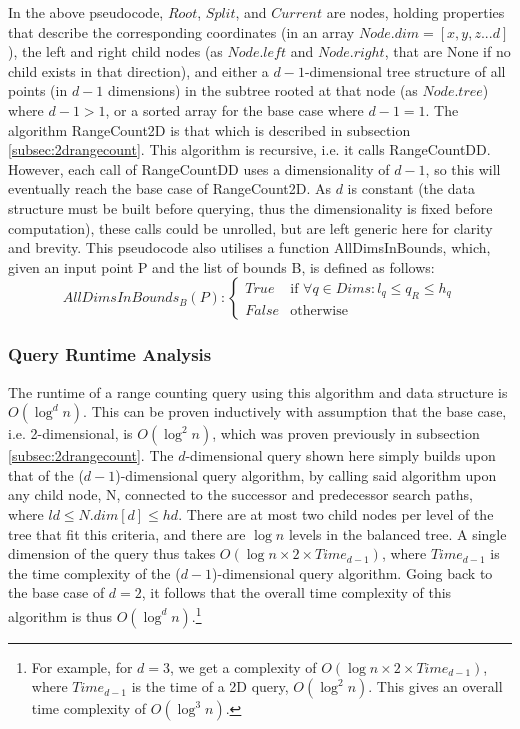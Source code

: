 \documentclass[paper=a4, fontsize=12pt]{article}
\begin{document}
In the above pseudocode, \(Root\), \(Split\), and \(Current\) are nodes, holding
properties that describe the corresponding coordinates (in an array \(Node.dim =
[x, y, z ... d]\)), the left and right child nodes (as \(Node.left\) and
\(Node.right\), that are None if no child exists in that direction), and either
a \(d-1\)-dimensional tree structure of all points (in \(d-1\) dimensions) in
the subtree rooted at that node (as \(Node.tree\)) where \(d-1 > 1\), or a
sorted array for the base case where \(d-1 = 1\). The algorithm RangeCount2D is
that which is described in subsection \ref{subsec:2drangecount}. This algorithm
is recursive, i.e. it calls RangeCountDD. However, each call of RangeCountDD
uses a dimensionality of \(d-1\), so this will eventually reach the base case of
RangeCount2D. As \(d\) is constant (the data structure must be built before
querying, thus the dimensionality is fixed before computation), these calls
could be unrolled, but are left generic here for clarity and brevity. This pseudocode also utilises a function AllDimsInBounds, which, given an input point P and the list of bounds B, is defined as follows:
\begin{displaymath}
AllDimsInBounds_B(P) :
\begin{cases}
True  & \text{if } \forall q \in Dims : l_q \leq q_R \leq h_q \\
False & \text{otherwise}
\end{cases}
\end{displaymath}

\subsubsection{Query Runtime Analysis}

The runtime of a range counting query using this algorithm and data structure is
\(O(\log^d n)\). This can be proven inductively with assumption that the base
case, i.e. 2-dimensional, is \(O(\log^2 n)\), which was proven previously in
subsection \ref{subsec:2drangecount}. The \(d\)-dimensional query shown here
simply builds upon that of the (\(d-1\))-dimensional query algorithm, by calling
said algorithm upon any child node, N, connected to the successor and
predecessor search paths, where \(ld \leq N.dim[d] \leq hd\). There are at most
two child nodes per level of the tree that fit this criteria, and there are
\(\log n\) levels in the balanced tree. A single dimension of the query thus
takes \(O(\log n \times 2 \times Time_{d-1})\), where \(Time_{d-1}\) is the time
complexity of the (\(d-1\))-dimensional query algorithm. Going back to the base
case of \(d=2\), it follows that the overall time complexity of this algorithm
is thus \(O(\log^d n)\).\footnote{For example, for \(d=3\), we get a complexity
  of \(O(\log n \times 2 \times Time_{d-1})\), where \(Time_{d-1}\) is the time
  of a 2D query, \(O(\log^2 n)\). This gives an overall time complexity of
  \(O(\log^3 n)\).}
\end{document}
